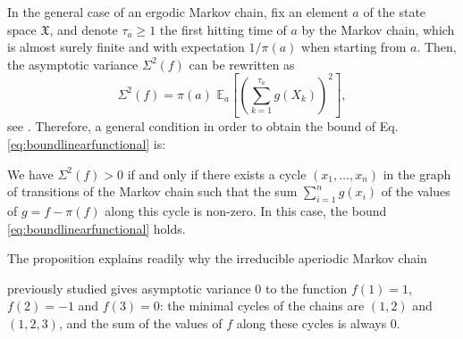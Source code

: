 \documentclass[envcountsame]{svmult}
\newcommand{\esper}{\mathbb{E}}
\newcommand{\spa}{\mathfrak{X}}
\begin{document}
In the general case of an ergodic Markov chain, fix an element $a$ of the state space $\spa$, and denote $\tau_a\geq 1$ the first hitting time of $a$ by the Markov chain, which is almost surely finite and with expectation $1/\pi(a)$ when starting from $a$. Then, the asymptotic variance $\varSigma^2(f)$ can be rewritten as
$$\varSigma^2(f) = \pi(a)\,\,\esper_a\!\left[\left(\sum_{k=1}^{\tau_a} g(X_k)\right)^2\right],$$
see \cite[Chapter 4]{KS76}. Therefore, a general condition in order to obtain the bound of Eq. \eqref{eq:boundlinearfunctional} is:
\begin{proposition}
We have $\varSigma^2(f)>0$ if and only if there exists a cycle $(x_1,\ldots,x_n)$ in the graph of transitions of the Markov chain such that the sum $\sum_{i=1}^n g(x_i)$ of the values of $g=f-\pi(f)$ along this cycle is non-zero. In this case, the bound \eqref{eq:boundlinearfunctional} holds.
\end{proposition}
\noindent The proposition explains readily why the irreducible aperiodic Markov chain
\begin{center}
\end{center}
previously studied gives asymptotic variance $0$ to the function $f(1)=1$, $f(2)=-1$ and $f(3)=0$: the minimal cycles of the chains are $(1,2)$ and $(1,2,3)$, and the sum of the values of $f$ along these cycles is always $0$.\bigskip
\end{document}
